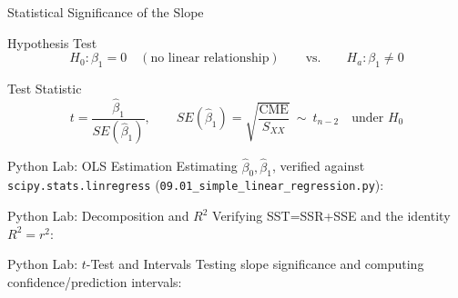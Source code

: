 \documentclass[10pt, aspectratio=169]{beamer}
\begin{document}
\begin{frame}{Statistical Significance of the Slope}
  \footnotesize
  \begin{block}{Hypothesis Test}
    $$H_0:\beta_1=0 \quad (\text{no linear relationship}) \qquad \text{vs.} \qquad H_a:\beta_1\neq0$$
  \end{block}
  \pause

  \vspace{0.1cm}
  \begin{alertblock}{Test Statistic}
    $$t=\frac{\hat\beta_1}{SE(\hat\beta_1)}, \qquad SE(\hat\beta_1)=\sqrt{\frac{\text{CME}}{S_{XX}}} \ \sim\ t_{n-2} \quad\text{under } H_0$$
  \end{alertblock}
\end{frame}

\begin{frame}[fragile]{Python Lab: OLS Estimation}
  \scriptsize
  Estimating $\hat\beta_0,\hat\beta_1$, verified against \texttt{scipy.stats.linregress} (\texttt{09.01\_simple\_linear\_regression.py}):
  {
  }
\end{frame}

\begin{frame}[fragile]{Python Lab: Decomposition and $R^2$}
  \scriptsize
  Verifying SST=SSR+SSE and the identity $R^2=r^2$:
  {
  }
\end{frame}

\begin{frame}[fragile]{Python Lab: $t$-Test and Intervals}
  \scriptsize
  Testing slope significance and computing confidence/prediction intervals:
  {
  }
\end{frame}
\end{document}
